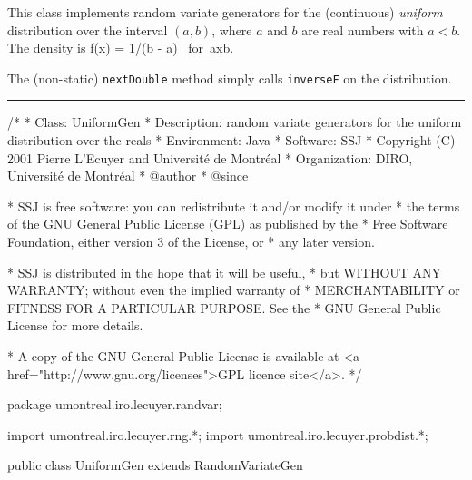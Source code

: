 
This class implements random variate generators for
the (continuous) {\em uniform\/} distribution over the interval $(a,b)$,
where $a$ and $b$ are real numbers with $a < b$.
The density is 
\eq
  f(x) = 1/(b - a) \qquad\mbox{ for }a\le x\le b.
\endeq

The (non-static) \texttt{nextDouble} method simply calls \texttt{inverseF} on the
distribution.

\bigskip\hrule

\begin{code}
\begin{hide}
/*
 * Class:        UniformGen
 * Description:  random variate generators for the uniform distribution over the reals
 * Environment:  Java
 * Software:     SSJ 
 * Copyright (C) 2001  Pierre L'Ecuyer and Université de Montréal
 * Organization: DIRO, Université de Montréal
 * @author       
 * @since

 * SSJ is free software: you can redistribute it and/or modify it under
 * the terms of the GNU General Public License (GPL) as published by the
 * Free Software Foundation, either version 3 of the License, or
 * any later version.

 * SSJ is distributed in the hope that it will be useful,
 * but WITHOUT ANY WARRANTY; without even the implied warranty of
 * MERCHANTABILITY or FITNESS FOR A PARTICULAR PURPOSE.  See the
 * GNU General Public License for more details.

 * A copy of the GNU General Public License is available at
   <a href="http://www.gnu.org/licenses">GPL licence site</a>.
 */
\end{hide}
package umontreal.iro.lecuyer.randvar;\begin{hide}
import umontreal.iro.lecuyer.rng.*;
import umontreal.iro.lecuyer.probdist.*;
\end{hide}

public class UniformGen extends RandomVariateGen \begin{hide} {
   private double a;
   private double b;
\end{hide}\end{code}

